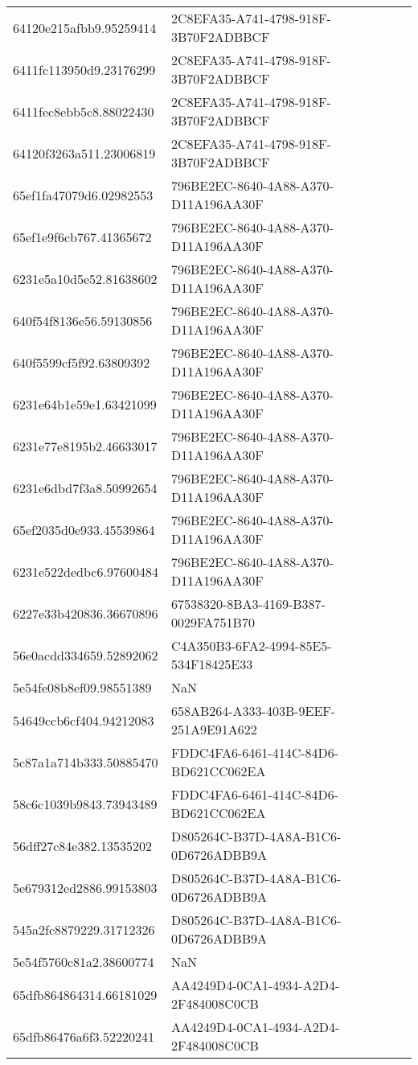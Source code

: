 \begin{tabular}{ll}
64120e215afbb9.95259414 & 2C8EFA35-A741-4798-918F-3B70F2ADBBCF \\
6411fc113950d9.23176299 & 2C8EFA35-A741-4798-918F-3B70F2ADBBCF \\
6411fec8ebb5c8.88022430 & 2C8EFA35-A741-4798-918F-3B70F2ADBBCF \\
64120f3263a511.23006819 & 2C8EFA35-A741-4798-918F-3B70F2ADBBCF \\
65ef1fa47079d6.02982553 & 796BE2EC-8640-4A88-A370-D11A196AA30F \\
65ef1e9f6cb767.41365672 & 796BE2EC-8640-4A88-A370-D11A196AA30F \\
6231e5a10d5e52.81638602 & 796BE2EC-8640-4A88-A370-D11A196AA30F \\
640f54f8136e56.59130856 & 796BE2EC-8640-4A88-A370-D11A196AA30F \\
640f5599cf5f92.63809392 & 796BE2EC-8640-4A88-A370-D11A196AA30F \\
6231e64b1e59e1.63421099 & 796BE2EC-8640-4A88-A370-D11A196AA30F \\
6231e77e8195b2.46633017 & 796BE2EC-8640-4A88-A370-D11A196AA30F \\
6231e6dbd7f3a8.50992654 & 796BE2EC-8640-4A88-A370-D11A196AA30F \\
65ef2035d0e933.45539864 & 796BE2EC-8640-4A88-A370-D11A196AA30F \\
6231e522dedbc6.97600484 & 796BE2EC-8640-4A88-A370-D11A196AA30F \\
6227e33b420836.36670896 & 67538320-8BA3-4169-B387-0029FA751B70 \\
56e0acdd334659.52892062 & C4A350B3-6FA2-4994-85E5-534F18425E33 \\
5e54fe08b8ef09.98551389 & NaN \\
54649ccb6cf404.94212083 & 658AB264-A333-403B-9EEF-251A9E91A622 \\
5c87a1a714b333.50885470 & FDDC4FA6-6461-414C-84D6-BD621CC062EA \\
58c6c1039b9843.73943489 & FDDC4FA6-6461-414C-84D6-BD621CC062EA \\
56dff27c84e382.13535202 & D805264C-B37D-4A8A-B1C6-0D6726ADBB9A \\
5e679312ed2886.99153803 & D805264C-B37D-4A8A-B1C6-0D6726ADBB9A \\
545a2fc8879229.31712326 & D805264C-B37D-4A8A-B1C6-0D6726ADBB9A \\
5e54f5760c81a2.38600774 & NaN \\
65dfb864864314.66181029 & AA4249D4-0CA1-4934-A2D4-2F484008C0CB \\
65dfb86476a6f3.52220241 & AA4249D4-0CA1-4934-A2D4-2F484008C0CB \\

\end{tabular}
